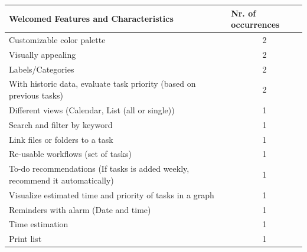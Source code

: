 \FloatBarrier
\begin{table}[!htbp]
    \centering
    \begin{adjustbox}{width=1.2\textwidth,center=\textwidth}
    \begin{tabular}{|l|l|}
        \hline
        \textbf{Welcomed Features and Characteristics}                                   & \textbf{Nr. of occurrences} \\ \hline
        Customizable color palette                                                         & \multicolumn{1}{c|}{2} \\ \hline
        Visually appealing                                                                 & \multicolumn{1}{c|}{2} \\ \hline
        Labels/Categories                                                                  & \multicolumn{1}{c|}{2} \\ \hline
        With historic data, evaluate task priority (based on previous tasks)               & \multicolumn{1}{c|}{2} \\ \hline
        Different views (Calendar, List (all or single))                                   & \multicolumn{1}{c|}{1} \\ \hline
        Search and filter by keyword                                                       & \multicolumn{1}{c|}{1} \\ \hline
        Link files or folders to a task                                                    & \multicolumn{1}{c|}{1} \\ \hline
        Re-usable workflows (set of tasks)                                                 & \multicolumn{1}{c|}{1} \\ \hline
        To-do recommendations (If tasks is added weekly, recommend it automatically)       & \multicolumn{1}{c|}{1} \\ \hline
        Visualize estimated time and priority of tasks in a graph                          & \multicolumn{1}{c|}{1} \\ \hline
        Reminders with alarm (Date and time)                                               & \multicolumn{1}{c|}{1} \\ \hline
        Time estimation                                                                    & \multicolumn{1}{c|}{1} \\ \hline
        Print list                                                                         & \multicolumn{1}{c|}{1} \\ \hline

\end{tabular}
\end{adjustbox}
\end{table}
